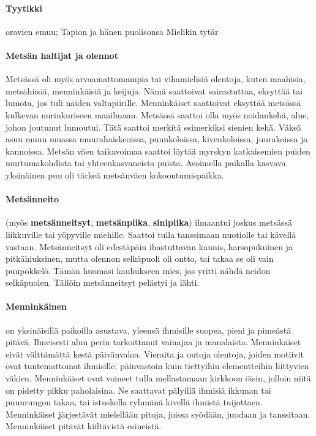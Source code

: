   \paragraph{Tyytikki} oravien emuu; Tapion ja hänen puolisonsa Mielikin tytär
  \paragraph{Metsän haltijat ja olennot} Metsässä oli myös arvaamattomampia tai vihamielisiä 
    olentoja, kuten maahisia, metsähiisiä, menninkäisiä ja keijuja. Nämä saattoivat sairastuttaa, 
    eksyttää tai lumota, jos tuli näiden valtapiirille. Menninkäiset saattoivat eksyttää metsässä 
    kulkevan nurinkuriseen maailmaan. Metsässä saattoi olla myös noidankehä, alue, johon joutunut 
    lumoutui. Tätä saattoi merkitä esimerkiksi sienien kehä. Väkeä asuu muun muassa 
    muurahaiskeoissa, puunkoloissa, kivenkoloissa, juurakoissa ja kannoissa. Metsän väen 
    taikavoimaa saattoi löytää myrskyn katkaisemien puiden murtumakohdista tai yhteenkasvaneista 
    puista. Avoimella paikalla kasvava yksinäinen puu oli tärkeä metsänväen kokoontumispaikka.
  \paragraph{Metsänneito} (myös \textbf{metsänneitsyt}, \textbf{metsänpiika}, \textbf{sinipiika}) 
    ilmaantui joskus metsässä liikkuville tai yöpyville miehille. Saattoi tulla tanssimaan 
    nuotiolle tai kävellä vastaan. Metsänneitsyt oli edestäpäin ihastuttavan kaunis, 
    harsopukuinen ja pitkähiuksinen, mutta olennon selkäpuoli oli ontto, tai takaa se oli vain 
    puupökkelö. Tämän huomasi kauhukseen mies, jos yritti nähdä neidon selkäpuolen. Tällöin 
    metsänneitsyt pelästyi ja lähti.
  \paragraph{Menninkäinen} on yksinäisillä paikoilla asustava, yleensä ihmisille suopea, pieni 
    ja pimeästä pitävä. Ilmeisesti alun perin tarkoittanut vainajaa ja manalaista. Menninkäiset 
    eivät välttämättä kestä päivänvaloa. Vieraita ja outoja olentoja, joiden motiivit ovat 
    tuntemattomat ihmisille, päinvastoin kuin tiettyihin elementteihin liittyvien väkien. 
    Menninkäiset ovat voineet tulla mellastamaan kirkkoon öisin, jolloin niitä on pidetty 
    pikku paholaisina. Ne saattavat pälyillä ihmisiä ikkunan tai puunrungon takaa, tai 
    istuskella ryhmänä kivellä ihmistä tuijottaen. Menninkäiset järjestävät mielellään pitoja, 
    joissa syödään, juodaan ja tanssitaan. Menninkäiset pitävät kiiltävistä esineistä.
